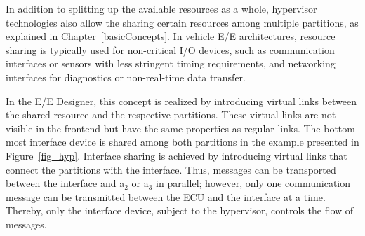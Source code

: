         In addition to splitting up the available resources as a whole, hypervisor technologies also allow the sharing certain resources among multiple partitions, as explained in Chapter~\ref{basicConcepts}. In vehicle E/E architectures, resource sharing is typically used for non-critical I/O devices, such as communication interfaces or sensors with less stringent timing requirements, and networking interfaces for diagnostics or non-real-time data transfer.  
          
           
         
         In the E/E Designer, this concept is realized by introducing virtual links between the shared resource and the respective partitions. These virtual links are not visible in the frontend but have the same properties as regular links.
        The bottom-most interface device is shared among both partitions in the example presented in Figure~\ref{fig_hyp}. Interface sharing is achieved by introducing virtual links that connect the partitions with the interface. Thus, messages can be transported between the interface and a$_2$ or a$_3$ in parallel; however, only one communication message can be transmitted between the ECU and the interface at a time. Thereby, only the interface device, subject to the hypervisor, controls the flow of messages.
         
         
         
         
         
